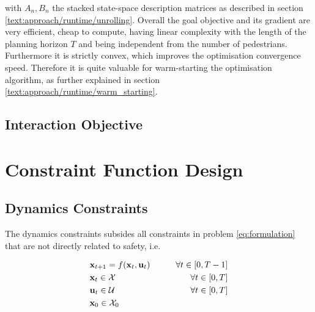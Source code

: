 with $A_n, B_n$ the stacked state-space description matrices as described in section \ref{text:approach/runtime/unrolling}. 
\newline
Overall the goal objective and its gradient are very efficient, cheap to compute, having linear complexity with the length of the planning horizon $T$ and being independent from the number of pedestrians. Furthermore it is strictly convex, which improves the optimisation convergence speed. Therefore it is quite valuable for warm-starting the optimisation algorithm, as further explained in section \ref{text:approach/runtime/warm_starting}.


\subsection{Interaction Objective}
\label{text:approach/objective/interactive}


\section{Constraint Function Design}
\label{text:approach/constraint}

\subsection{Dynamics Constraints}
\label{text:approach/constraint/dynamics}
The dynamics constraints subsides all constraints in problem \ref{eq:formulation} that are not directly related to safety, i.e. 

\begin{align}
\label{eq:constraint_f}
&\mathbf{x}_{t+1} = f(\mathbf{x}_t, \mathbf{u}_t) \qquad& \forall t \in [0, T - 1] \\
\label{eq:constraint_x}
&\mathbf{x}_t \in \mathcal{X} & \forall t \in [0, T]\\
\label{eq:constraint_u}
&\mathbf{u}_t \in \mathcal{U} & \forall t \in [0, T]\\
\label{eq:constraint_x0}
&\mathbf{x}_0 \in \mathcal{X}_0
\end{align}

